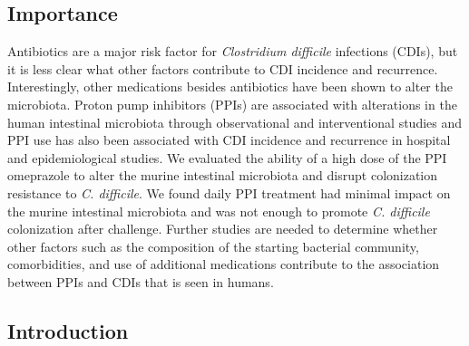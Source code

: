 \documentclass[11pt,]{article}
\begin{document}
\subsection{Importance}\label{importance}

Antibiotics are a major risk factor for \emph{Clostridium difficile}
infections (CDIs), but it is less clear what other factors contribute to
CDI incidence and recurrence. Interestingly, other medications besides
antibiotics have been shown to alter the microbiota. Proton pump
inhibitors (PPIs) are associated with alterations in the human
intestinal microbiota through observational and interventional studies
and PPI use has also been associated with CDI incidence and recurrence
in hospital and epidemiological studies. We evaluated the ability of a
high dose of the PPI omeprazole to alter the murine intestinal
microbiota and disrupt colonization resistance to \emph{C. difficile}.
We found daily PPI treatment had minimal impact on the murine intestinal
microbiota and was not enough to promote \emph{C. difficile}
colonization after challenge. Further studies are needed to determine
whether other factors such as the composition of the starting bacterial
community, comorbidities, and use of additional medications contribute
to the association between PPIs and CDIs that is seen in humans.

\newpage

\subsection{Introduction}\label{introduction}
\end{document}
